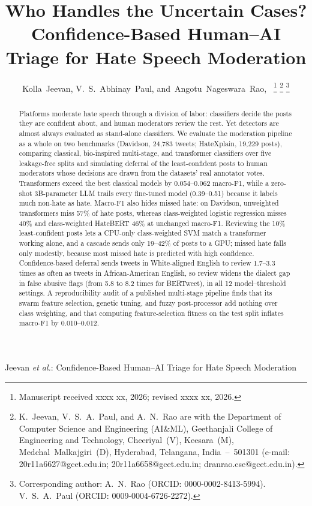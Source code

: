 \documentclass[lettersize,journal]{IEEEtran}
\begin{document}
\title{Who Handles the Uncertain Cases? Confidence-Based Human--AI Triage for Hate Speech Moderation}

\author{Kolla~Jeevan,
        V.~S.~Abhinay~Paul,
        and~Angotu~Nageswara~Rao,~%
\thanks{Manuscript received xxxx xx, 2026; revised xxxx xx, 2026.}%
\thanks{K.~Jeevan, V.~S.~A.~Paul, and A.~N.~Rao are with the Department of Computer Science and Engineering (AI\&ML), Geethanjali College of Engineering and Technology, Cheeriyal~(V), Keesara~(M), Medchal~Malkajgiri~(D), Hyderabad, Telangana, India~--~501301 (e-mail: 20r11a6627@gcet.edu.in; 20r11a6658@gcet.edu.in; dranrao.cse@gcet.edu.in).}%
\thanks{Corresponding author: A.~N.~Rao (ORCID: 0000-0002-8413-5994). V.~S.~A.~Paul (ORCID: 0009-0004-6726-2272).}}

%
{Jeevan \MakeLowercase{\textit{et al.}}: Confidence-Based Human--AI Triage for Hate Speech Moderation}

\maketitle

\begin{abstract}
Platforms moderate hate speech through a division of labor: classifiers decide the posts they are confident about, and human moderators review the rest. Yet detectors are almost always evaluated as stand-alone classifiers. We evaluate the moderation pipeline as a whole on two benchmarks (Davidson, 24,783 tweets; HateXplain, 19,229 posts), comparing classical, bio-inspired multi-stage, and transformer classifiers over five leakage-free splits and simulating deferral of the least-confident posts to human moderators whose decisions are drawn from the datasets' real annotator votes. Transformers exceed the best classical models by 0.054--0.062 macro-F1, while a zero-shot 3B-parameter LLM trails every fine-tuned model (0.39--0.51) because it labels much non-hate as hate. Macro-F1 also hides missed hate: on Davidson, unweighted transformers miss 57\% of hate posts, whereas class-weighted logistic regression misses 40\% and class-weighted HateBERT 46\% at unchanged macro-F1. Reviewing the 10\% least-confident posts lets a CPU-only class-weighted SVM match a transformer working alone, and a cascade sends only 19--42\% of posts to a GPU; missed hate falls only modestly, because most missed hate is predicted with high confidence. Confidence-based deferral sends tweets in White-aligned English to review 1.7--3.3 times as often as tweets in African-American English, so review widens the dialect gap in false abusive flags (from 5.8 to 8.2 times for BERTweet), in all 12 model--threshold settings. A reproducibility audit of a published multi-stage pipeline finds that its swarm feature selection, genetic tuning, and fuzzy post-processor add nothing over class weighting, and that computing feature-selection fitness on the test split inflates macro-F1 by 0.010--0.012.
\end{abstract}
\end{document}
